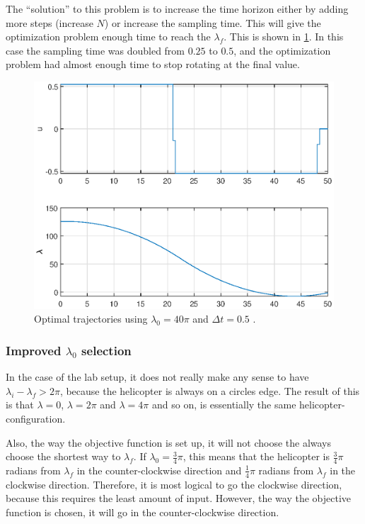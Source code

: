 \documentclass[../main.tex]{subfiles}
\begin{document}
The ``solution'' to this problem is to increase the time horizon either by adding more steps (increase $N$) or increase the sampling time. This will give the optimization problem enough time to reach the $ \lambda_f $. This is shown in \cref{fig:lab2_inc_delta_t}. In this case the sampling time was doubled from $ 0.25 $ to $ 0.5 $, and the optimization problem had almost enough time to stop rotating at the final value. 
\begin{figure}[h]
	\centering
	\includegraphics[width=\linewidth]{figures/lab2_1_5_example_2.eps}
	\caption{Optimal trajectories using $\lambda_0 = 40\pi$ and $ \Delta t = 0.5$ .}
	\label{fig:lab2_inc_delta_t}
\end{figure}

\subsubsection{Improved $ \lambda_0 $ selection}
In the case of the lab setup, it does not really make any sense to have $ \lambda_i-\lambda_f >  2\pi $, because the helicopter is always on a circles edge. The result of this is that $ \lambda = 0 $, $ \lambda = 2\pi $ and $ \lambda = 4\pi $ and so on, is essentially the same helicopter-configuration. 

Also, the way the objective function is set up, it will not choose the always choose the shortest way to $ \lambda_f $. If $ \lambda_0 = \frac{3}{4} \pi $, this means that the helicopter is $\frac{3}{4} \pi $ radians from $ \lambda_f $ in the counter-clockwise direction and  $\frac{1}{4} \pi $ radians from  $ \lambda_f $ in the clockwise direction. Therefore, it is most logical to go the clockwise direction, because this requires the least amount of input. However, the way the objective function is chosen, it will go in the counter-clockwise direction.
\end{document}
